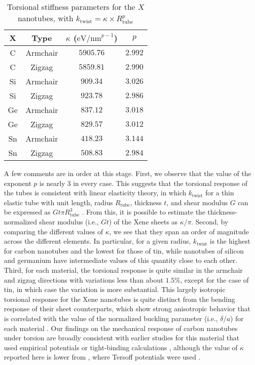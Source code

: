 \documentclass[preprint,12pt, 3p, sort&compress]{elsarticle}
\begin{document}
\begin{table}[htb]
\centering
\begin{tabular}{c c c c}
\hline
X & Type &  $\kappa$ ($\text{eV/nm}^{p-1}$) & $p$\\
\hline
C & Armchair  & $5905.76$ & $2.992$   \\ 
C & Zigzag  & $5859.81$ & $2.990$   \\ 
Si & Armchair  & $909.34$ & $3.026$   \\ 
Si & Zigzag  & $923.78$ & $2.986$   \\ 
Ge & Armchair  & $837.12$ & $3.018$   \\ 
Ge & Zigzag  & $829.57$ & $3.012$   \\ 
Sn & Armchair  & $418.23$ & $3.144$   \\ 
Sn & Zigzag  & $508.83$ & $2.984$   \\ 
\hline 
\end{tabular}
\caption{Torsional stiffness parameters for the $X$ nanotubes, with $k_{\text{twist}} = \kappa\times R_{\text{tube}}^p$}
\label{Table:kappa_p}
\end{table} 

A few comments are in order at this stage. First, we observe that the value of the exponent $p$ is nearly $3$ in every case. This suggests that the torsional response of the tubes is consistent with linear elasticity theory, in which $k_{\text{twist}}$ for a thin elastic tube with unit length, radius $R_{\text{tube}}$, thickness $t$, and shear modulus $G$ can be expressed as $Gt\pi R_{\text{tube}}^3$ \citep{timoshenko1968elements}. From this, it is possible to estimate the thickness-normalized shear modulus (i.e., $Gt$) of the Xene sheets as $\kappa / \pi$. Second, by comparing the different values of $\kappa$, we see that they span an order of magnitude across the different elements. In particular, for a given radius, $k_{\text{twist}}$ is the highest for carbon nanotubes and the lowest for those of tin, while nanotubes of silicon and germanium have intermediate values of this quantity close to each other. Third, for each material, the torsional response is quite similar in the armchair and zigzag directions with variations less than about $1.5\%$, except for the case of tin, in which case the variation is more substantial. This largely isotropic torsional response for the Xene nanotubes is quite distinct from the bending response of their sheet counterparts, which show strong anisotropic behavior that is correlated with the value of the normalized buckling parameter (i.e., $\delta/a$) for each material \citep{ghosh2019symmetry}. Our findings on the mechanical response of carbon nanotubes under torsion are broadly consistent with earlier studies for this material that used empirical potentials or tight-binding calculations \citep{Dumitrica_James_OMD, CNT_Dumitrica}, although the value of $\kappa$ reported here is lower from \citep{Dumitrica_James_OMD}, where Tersoff potentials were used \citep{tersoff1988new}.
\end{document}
